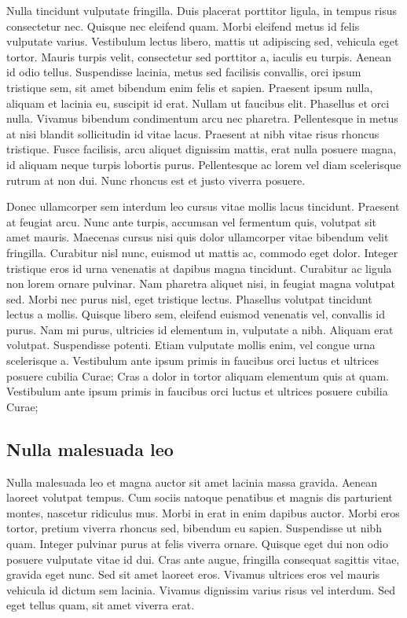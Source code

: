 Nulla tincidunt vulputate fringilla.
Duis placerat porttitor ligula, in tempus risus consectetur nec.
Quisque nec eleifend quam.
Morbi eleifend metus id felis vulputate varius.
Vestibulum lectus libero, mattis ut adipiscing sed, vehicula eget tortor.
Mauris turpis velit, consectetur sed porttitor a, iaculis eu turpis.
Aenean id odio tellus.
Suspendisse lacinia, metus sed facilisis convallis, orci ipsum tristique sem, sit amet bibendum enim felis et sapien.
Praesent ipsum nulla, aliquam et lacinia eu, suscipit id erat.
Nullam ut faucibus elit.
Phasellus et orci nulla.
Vivamus bibendum condimentum arcu nec pharetra.
Pellentesque in metus at nisi blandit sollicitudin id vitae lacus.
Praesent at nibh vitae risus rhoncus tristique.
Fusce facilisis, arcu aliquet dignissim mattis, erat nulla posuere magna, id aliquam neque turpis lobortis purus.
Pellentesque ac lorem vel diam scelerisque rutrum at non dui.
Nunc rhoncus est et justo viverra posuere.

Donec ullamcorper sem interdum leo cursus vitae mollis lacus tincidunt.
Praesent at feugiat arcu.
Nunc ante turpis, accumsan vel fermentum quis, volutpat sit amet mauris.
Maecenas cursus nisi quis dolor ullamcorper vitae bibendum velit fringilla.
Curabitur nisl nunc, euismod ut mattis ac, commodo eget dolor.
Integer tristique eros id urna venenatis at dapibus magna tincidunt.
Curabitur ac ligula non lorem ornare pulvinar.
Nam pharetra aliquet nisi, in feugiat magna volutpat sed.
Morbi nec purus nisl, eget tristique lectus.
Phasellus volutpat tincidunt lectus a mollis.
Quisque libero sem, eleifend euismod venenatis vel, convallis id purus.
Nam mi purus, ultricies id elementum in, vulputate a nibh.
Aliquam erat volutpat.
Suspendisse potenti.
Etiam vulputate mollis enim, vel congue urna scelerisque a.
Vestibulum ante ipsum primis in faucibus orci luctus et ultrices posuere cubilia Curae; Cras a dolor in tortor aliquam elementum quis at quam.
Vestibulum ante ipsum primis in faucibus orci luctus et ultrices posuere cubilia Curae;

\subsection{Nulla malesuada leo}
Nulla malesuada leo et magna auctor sit amet lacinia massa gravida.
Aenean laoreet volutpat tempus.
Cum sociis natoque penatibus et magnis dis parturient montes, nascetur ridiculus mus.
Morbi in erat in enim dapibus auctor.
Morbi eros tortor, pretium viverra rhoncus sed, bibendum eu sapien.
Suspendisse ut nibh quam.
Integer pulvinar purus at felis viverra ornare.
Quisque eget dui non odio posuere vulputate vitae id dui.
Cras ante augue, fringilla consequat sagittis vitae, gravida eget nunc.
Sed sit amet laoreet eros.
Vivamus ultrices eros vel mauris vehicula id dictum sem lacinia.
Vivamus dignissim varius risus vel interdum.
Sed eget tellus quam, sit amet viverra erat.

